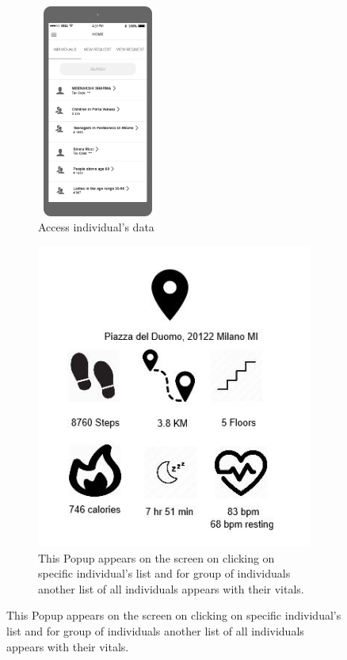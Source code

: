 \begin{figure}[H]
	\centering
	\begin{subfigure}[b]{0.4\textwidth}	
		\includegraphics[width=4cm,height=7cm]		{./RASD_Mockups/3_T-Home.png}
      	\caption{Access individual's data}
        \label{TrackMe_data}
	 \end{subfigure}
     \begin{subfigure}[b]{0.4\textwidth}	
		\includegraphics[width=\textwidth]		{./RASD_Mockups/3_T_popup.jpg}
      	\caption{This Popup appears on the screen on clicking on specific individual's list and for group of individuals another list of all individuals appears with their vitals.}
        \label{TrackMe_popup}
	 \end{subfigure}
\end{figure}

